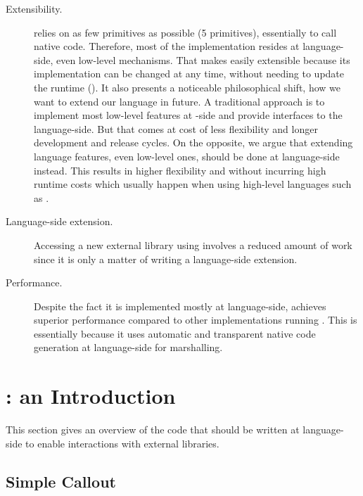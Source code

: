 \begin{description}
	\item[Extensibility.] \NBFFI relies on as few \VM primitives as possible (5 primitives), essentially to call native code. 
	Therefore, most of the implementation resides at language-side, even low-level mechanisms.
	That makes \NBFFI easily extensible because its implementation can be changed at any time, without needing to update the runtime (\VM).
	It also presents a noticeable philosophical shift, how we want to extend our language in future.
	A traditional approach is to implement most low-level features at \VM-side and provide interfaces to the language-side.
	But that comes at cost of less flexibility and longer development and release cycles.
	On the opposite, we argue that extending language features, even low-level ones, should be done at language-side instead.
	This results in higher flexibility and without incurring high runtime costs which usually happen when using high-level languages such as \PH.
	\item[Language-side extension.] Accessing a new external library using \NBFFI involves a reduced amount of work since it is only a matter of writing a language-side extension.
	\item[Performance.] Despite the fact it is implemented mostly at language-side, \NBFFI achieves superior performance compared to other \FFI implementations running \PH.
    This is essentially because it uses automatic and transparent native code generation at language-side for marshalling.
\end{description}


\section{\NBFFI: an Introduction}

This section gives an overview of the code that should be written at language-side
to enable interactions with external libraries.


\subsection{Simple Callout}

